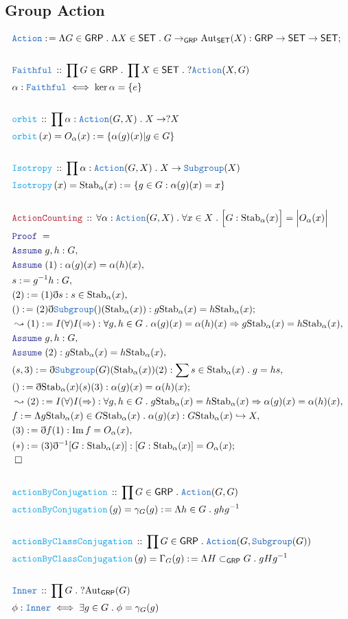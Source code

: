\documentclass[12pt]{scrartcl}
\newcommand{\TYPE}[1]{\textcolor{NavyBlue}{\mathtt{#1}}}
\newcommand{\FUNC}[1]{\textcolor{Cerulean}{\mathtt{#1}}}
\newcommand{\LOGIC}[1]{\textcolor{Blue}{\mathtt{#1}}}
\newcommand{\THM}[1]{\textcolor{Maroon}{\mathtt{#1}}}
\renewcommand{\.}{\; . \;}
\newcommand{\de}{: \kern 0.1pc =}
\newcommand{\Act}[1]{\left( #1 \right)}
\newcommand{\Theorem}[2]{& \THM{#1} \, :: \, #2 \\ & \Proof = \\ }
\newcommand{\DeclareType}[2]{& \TYPE{#1} \, :: \, #2 \\}
\newcommand{\DefineType}[3]{& #1 : \TYPE{#2} \iff #3 \\}
\newcommand{\DeclareFunc}[2]{& \FUNC{#1} \, :: \, #2 \\}
\newcommand{\DefineNamedFunc}[4]{&  \FUNC{#1}\Act{#2} = #3 \de #4 \\}
\newcommand{\Page}[1]{ \begin{align*} #1 \end{align*}   }
\newcommand{ \bd }{ \ByDef }
\DeclareMathOperator*{\im}{Im}
\newcommand{\Aut}{\mathrm{Aut}}
\newcommand{\ToInj}{\hookrightarrow}
\newcommand{\Say}[3]{& #1 \de #2 : #3, \\}
\newcommand{\Conclude}[3]{& #1 \de #2 : #3; \\}
\newcommand{\Derive}[3]{& \leadsto #1 \de #2 : #3, \\}
\newcommand{\Assume}[2]{& \LOGIC{Assume} \; #1 : #2, \\}
\newcommand{\QED}{\; \square}
\newcommand{\EndProof}{& \QED \\}
\newcommand{\ByDef}{\eth}
\newcommand{\Proof}{\LOGIC{Proof} \; }
\newcommand{\SET}{\mathsf{SET}}
\newcommand{\Sgrp}{\subset_{\mathsf{GRP}}}
\newcommand{\Stab}{\mathrm{Stab}}
\newcommand{\GRP}{\mathsf{GRP}}
\begin{document}
\subsection{Group Action}
\Page{
	\Conclude{\TYPE{Action}}{\Lambda G \in \GRP \. \Lambda X \in \SET \. G \to_{\GRP} \Aut_{\SET}(X)}{
		\GRP \to \SET \to \SET }
	\\
	\DeclareType{Faithful}{\prod G \in \GRP \. \prod X \in \SET \. ?\TYPE{Action}(X,G)}
	\DefineType{\alpha}{Faithful}{ \ker \alpha = \{e\}  }
	\\
	\DeclareFunc{orbit}{ \prod \alpha : \TYPE{Action}(G,X) \. X \to ?X }
	\DefineNamedFunc{orbit}{x}{O_\alpha(x)}{\{ \alpha(g)(x) | g \in G   \}}
	\\
	\DeclareFunc{Isotropy}{\prod \alpha : \TYPE{Action}(G,X) \. X \to \TYPE{Subgroup}(X)}
	\DefineNamedFunc{Isotropy}{x}{\mathrm{Stab}_\alpha (x)}{ \{ g \in G  : \alpha(g)(x) = x \}  }
	\\
	\Theorem{ActionCounting}{ \forall \alpha : \TYPE{Action}(G,X) \. 
		 \forall x \in X \. \Big[G : \mathrm{Stab}_\alpha (x)\Big] = \Big|O_\alpha(x) \Big|
		}
	\Assume{g,h}{G}
	\Assume{(1)}{\alpha(g)(x) = \alpha(h)(x)}
	\Say{s}{ g^{-1}h   }{ G }
	\Say{(2)}{ (1)\bd s }{s \in \Stab_\alpha(x)}
	\Conclude{()}{ (2)\bd \TYPE{Subgroup}()(\Stab_\alpha(x))   }{g\Stab_\alpha(x) = h \Stab_\alpha(x)}
	\Derive{(1)}{I(\forall)I(\Rightarrow)}{\forall g,h \in G \. \alpha(g)(x) = \alpha(h)(x) \Rightarrow 
		g \Stab_\alpha(x) = h \Stab_\alpha(x)}
	\Assume{g,h}{G}
	\Assume{(2)}{g \Stab_\alpha(x) = h \Stab_\alpha(x)}
	\Say{(s,3)}{ \bd \TYPE{Subgroup}(G)(\Stab_\alpha(x))(2)}{ \sum s \in \Stab_\alpha(x) \. g = hs }
	\Conclude{()}{\bd \Stab_\alpha(x)(s)(3)}{ \alpha(g)(x) = \alpha(h)(x)}
	\Derive{(2)}{ I(\forall)I(\Rightarrow)  }{\forall g,h \in G \. g\Stab_\alpha(x) = h\Stab_\alpha(x) 
		\Rightarrow  \alpha(g)(x) = \alpha(h)(x)  }
	\Say{f}{\Lambda g\Stab_{\alpha}(x) \in G\Stab_\alpha(x) \. \alpha(g)(x) }{G\Stab_\alpha(x) \ToInj X}
	\Say{(3)}{\bd f (1)}{\im f = O_\alpha(x)}
	\Conclude{(*)}{(3)\bd^{-1} [G:\Stab_\alpha(x)] }{ [G : \Stab_\alpha(x)] =  O_\alpha(x)}
	\EndProof
	\\
	\DeclareFunc{actionByConjugation}{\prod G \in \GRP \. \TYPE{Action}(G,G)}
	\DefineNamedFunc{actionByConjugation}{g}{\gamma_G(g)}{\Lambda h \in G \. ghg^{-1}}
	\\
	\DeclareFunc{actionByClassConjugation}{\prod G \in \GRP \. \TYPE{Action}(G, \TYPE{Subgroup}(G))}
	\DefineNamedFunc{actionByClassConjugation}{g}{\Gamma_G(g)}{\Lambda H \Sgrp G \. gHg^{-1}}
	\\
	\DeclareType{Inner}{\prod G \. ? \Aut_{\GRP}(G)}
	\DefineType{\phi}{Inner}{\exists g \in G \. \phi = \gamma_G(g)}
}
\end{document}
